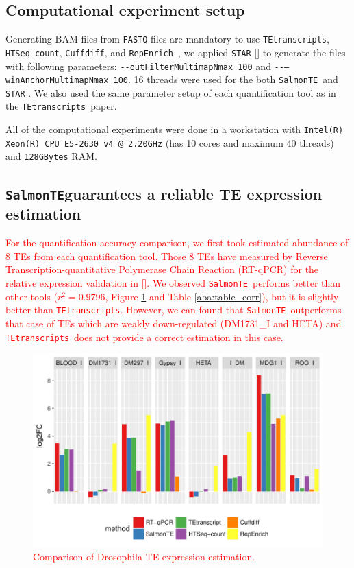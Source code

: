 \documentclass[wsdraft]{ws-procs11x85}
\newcommand{\TEtranscripts}{\texttt{TEtranscripts}}
\newcommand{\SalmonTE}{\texttt{SalmonTE}}
\newcommand{\HTSeq}{\texttt{HTSeq-count}}
\newcommand{\Cuffdiff}{\texttt{Cuffdiff}}
\newcommand{\RepEnrich}{\texttt{RepEnrich}}
\begin{document}
\subsection{Computational experiment setup}

Generating BAM files from \verb|FASTQ| files are mandatory to use \TEtranscripts, \HTSeq, \Cuffdiff, and \RepEnrich~, we applied \verb|STAR| [] to generate the files with following parameters: \verb|--outFilterMultimapNmax 100| and \verb|--–winAnchorMultimapNmax 100|. 16 threads were used for the both \SalmonTE~and \verb|STAR| . We also used the same parameter setup of each quantification tool as in the \TEtranscripts~paper.

All of the computational experiments were done in a workstation with \texttt{Intel(R) Xeon(R) CPU E5-2630 v4 @ 2.20GHz} (has 10 cores and maximum 40 threads) and \texttt{128GBytes} RAM. 

\subsection{\SalmonTE guarantees a reliable TE expression estimation}

\textcolor{red}{
For the quantification accuracy comparison, we first took estimated abundance of 8 TEs from each quantification tool. Those 8 TEs have measured by Reverse Transcription-quantitative Polymerase Chain Reaction (RT-qPCR) for the relative expression validation in [].
We observed \SalmonTE~performs better than other tools ($r^2=0.9796$, Figure \ref{aba:fig4} and Table \ref{aba:table_corr}), but 
it is slightly better than \TEtranscripts. However, we can found that \SalmonTE~outperforms that case of TEs which are weakly down-regulated (DM1731\_I and HETA) and \TEtranscripts~does not provide a correct estimation in this case.}

\begin{figure}[h]
\centerline{
\includegraphics[width=14cm]{fig_bar}
}
\caption{\textcolor{red}{Comparison of Drosophila TE expression estimation.}}
\label{aba:fig4}
\end{figure}
\end{document}
